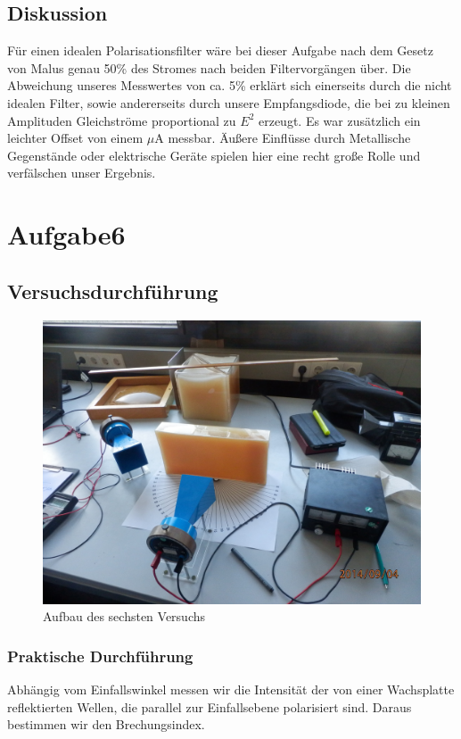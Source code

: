 \documentclass[12pt]{scrartcl}
\begin{document}
\subsection{Diskussion}
Für einen idealen Polarisationsfilter wäre bei dieser Aufgabe nach dem Gesetz von Malus genau 50\% des Stromes nach beiden Filtervorgängen über. Die Abweichung unseres Messwertes von ca. 5\% erklärt sich einerseits durch die nicht idealen Filter, sowie andererseits durch unsere Empfangsdiode, die bei zu kleinen Amplituden Gleichströme proportional zu $E^2$ erzeugt. Es war zusätzlich ein leichter Offset von einem $\mu$A messbar. Äußere Einflüsse durch Metallische Gegenstände oder elektrische Geräte spielen hier eine recht große Rolle und verfälschen unser Ergebnis.
\section{Aufgabe6}
\subsection{Versuchsdurchführung}
\begin{figure}[H] 
  \centering
    \includegraphics[scale = 0.1]{a_6.JPG}
  	\caption[Aufbau des sechsten Versuchs]{Aufbau des sechsten Versuchs}
  \label{fig:a_3}
\end{figure}
\subsubsection{Praktische Durchführung}
Abhängig vom Einfallswinkel messen wir die Intensität der von einer Wachsplatte reflektierten Wellen, die parallel zur Einfallsebene polarisiert sind. Daraus bestimmen wir den Brechungsindex.
\end{document}
